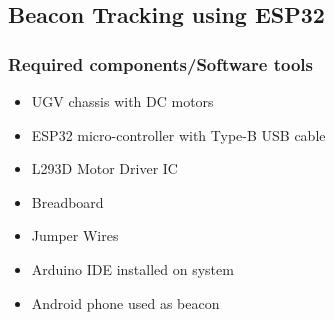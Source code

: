 \documentclass[a4paper,twoside]{iiththesis}
\begin{document}

    
    

\subsection{Beacon Tracking using ESP32} 
\subsubsection{Required components/Software tools}
\begin{itemize}
    \item  UGV chassis with DC motors
    \item  ESP32 micro-controller with Type-B USB cable
    \item  L293D Motor Driver IC
    \item  Breadboard
    \item  Jumper Wires
    \item  Arduino IDE installed on system
    \item  Android phone used as beacon
\end{itemize}
\end{document}

